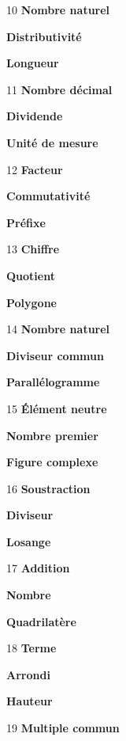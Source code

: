 \begin{tcbraster}[raster columns=3, raster column skip=0pt, raster row skip=0pt, raster valign=top]
\begin{fiche}{10}
\textbf{\large Nombre naturel}\par
\textbf{\large Distributivité}\par
\textbf{\large Longueur}
\end{fiche}
\begin{fiche}{11}
\textbf{\large Nombre décimal}\par
\textbf{\large Dividende}\par
\textbf{\large Unité de mesure}
\end{fiche}
\begin{fiche}{12}
\textbf{\large Facteur}\par
\textbf{\large Commutativité}\par
\textbf{\large Préfixe}
\end{fiche}
\begin{fiche}{13}
\textbf{\large Chiffre}\par
\textbf{\large Quotient}\par
\textbf{\large Polygone}
\end{fiche}
\begin{fiche}{14}
\textbf{\large Nombre naturel}\par
\textbf{\large Diviseur commun}\par
\textbf{\large Parallélogramme}
\end{fiche}
\begin{fiche}{15}
\textbf{\large Élément neutre}\par
\textbf{\large Nombre premier}\par
\textbf{\large Figure complexe}
\end{fiche}
\begin{fiche}{16}
\textbf{\large Soustraction}\par
\textbf{\large Diviseur}\par
\textbf{\large Losange}
\end{fiche}
\begin{fiche}{17}
\textbf{\large Addition}\par
\textbf{\large Nombre}\par
\textbf{\large Quadrilatère}
\end{fiche}
\begin{fiche}{18}
\textbf{\large Terme}\par
\textbf{\large Arrondi}\par
\textbf{\large Hauteur}
\end{fiche}
\begin{fiche}{19}
\textbf{\large Multiple commun}\par

\end{fiche}
\end{tcbraster}
